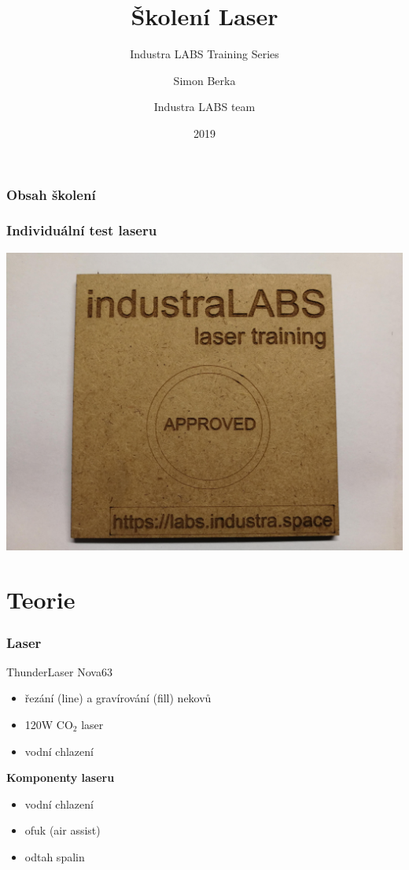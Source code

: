 \documentclass[14pt]{beamer}
\title[Školení Laser] %
{Školení Laser}
\subtitle{Industra LABS Training Series}
\author[Šimon Berka] %
{Simon Berka\inst{1} \and Industra LABS team\inst{2}}
\date[2019] %
{2019}
\begin{document}
\frame{\titlepage}


\begin{frame}
\frametitle{Obsah školení}
\tableofcontents
\end{frame}

\begin{frame}
\frametitle{Individuální test laseru}
\centering
\includegraphics[scale=0.06]{imgs/approved.jpg}
\end{frame}

\section{Teorie}

\begin{frame}
\frametitle{Laser}

\begin{block}{ThunderLaser Nova63}
\begin{itemize}
\item řezání (line) a gravírování (fill) nekovů
\item 120W CO$_{2}$ laser
\item vodní chlazení
\end{itemize}
\end{block}

\textbf{Komponenty laseru}
\begin{itemize}
	\item vodní chlazení
	\item ofuk (air assist)
	\item odtah spalin
	
\end{itemize}
\end{frame}
\end{document}
